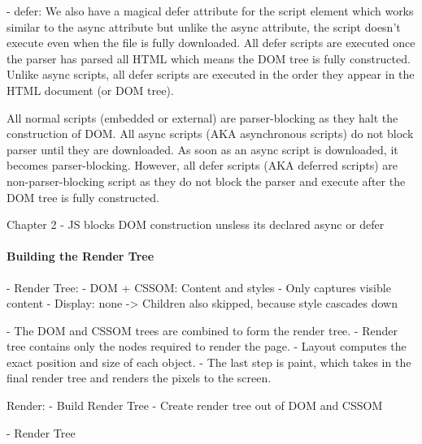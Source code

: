 - defer:
We also have a magical defer attribute for the script element which works similar to the async attribute but unlike the async attribute, the script doesn’t execute even when the file is fully downloaded. All defer scripts are executed once the parser has parsed all HTML which means the DOM tree is fully constructed. Unlike async scripts, all defer scripts are executed in the order they appear in the HTML document (or DOM tree).


All normal scripts (embedded or external) are parser-blocking as they halt the construction of DOM. All async scripts (AKA asynchronous scripts) do not block parser until they are downloaded. As soon as an async script is downloaded, it becomes parser-blocking. However, all defer scripts (AKA deferred scripts) are non-parser-blocking script as they do not block the parser and execute after the DOM tree is fully constructed.




Chapter 2
- JS blocks DOM construction unsless its declared async or defer







\paragraph{Building the Render Tree}



- Render Tree:
	- DOM + CSSOM: Content and styles
	- Only captures visible content
	- Display: none -> Children also skipped, because style cascades down
	
	
- The DOM and CSSOM trees are combined to form the render tree.
- Render tree contains only the nodes required to render the page.
- Layout computes the exact position and size of each object.
- The last step is paint, which takes in the final render tree and renders the pixels to the screen.


Render:
- Build Render Tree
- Create render tree out of DOM and CSSOM


- Render Tree


